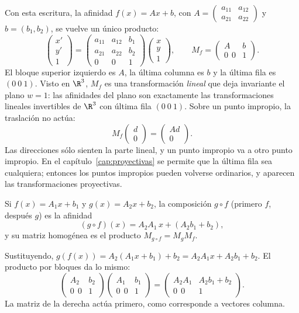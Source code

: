 Con esta escritura, la afinidad \(f(x)=Ax+b\), con \(A=\begin{pmatrix}a_{11}&a_{12}\\a_{21}&a_{22}\end{pmatrix}\)
y \(b=(b_1,b_2)\), se vuelve un único producto:
\[
\begin{pmatrix}x'\\y'\\1\end{pmatrix}
=
\begin{pmatrix}
a_{11}&a_{12}&b_1\\
a_{21}&a_{22}&b_2\\
0&0&1
\end{pmatrix}
\begin{pmatrix}x\\y\\1\end{pmatrix},
\qquad
M_f=\begin{pmatrix}A&b\\0\ \ 0&1\end{pmatrix}.
\]
El bloque superior izquierdo es \(A\), la última columna es \(b\) y la última fila es
\((0\ 0\ 1)\). Visto en \(\R^3\), \(M_f\) es una transformación \emph{lineal} que deja
invariante el plano \(w=1\): las afinidades del plano son exactamente las transformaciones
lineales invertibles de \(\R^3\) con última fila \((0\ 0\ 1)\). Sobre un punto impropio, la
traslación no actúa:
\[
  M_f\begin{pmatrix}d\\0\end{pmatrix}=\begin{pmatrix}Ad\\0\end{pmatrix}.
\]
Las direcciones sólo sienten la parte lineal, y un punto impropio va a otro punto impropio.
En el capítulo~\ref{cap:proyectivas} se permite que la última fila sea cualquiera; entonces los
puntos impropios pueden volverse ordinarios, y aparecen las transformaciones proyectivas.

\begin{proposicion}\label{prop:06-composicion}
Si \(f(x)=A_1x+b_1\) y \(g(x)=A_2x+b_2\), la composición \(g\circ f\) (primero \(f\), después
\(g\)) es la afinidad
\[
  (g\circ f)(x)=A_2A_1\,x+(A_2b_1+b_2),
\]
y su matriz homogénea es el producto \(M_{g\circ f}=M_gM_f\).
\end{proposicion}

\begin{demostracion}
Sustituyendo, \(g(f(x))=A_2(A_1x+b_1)+b_2=A_2A_1x+A_2b_1+b_2\). El producto por bloques da lo
mismo:
\[
\begin{pmatrix}A_2&b_2\\0\ \ 0&1\end{pmatrix}
\begin{pmatrix}A_1&b_1\\0\ \ 0&1\end{pmatrix}
=
\begin{pmatrix}A_2A_1&A_2b_1+b_2\\0\ \ 0&1\end{pmatrix}.
\]
La matriz de la derecha actúa primero, como corresponde a vectores columna.
\end{demostracion}

